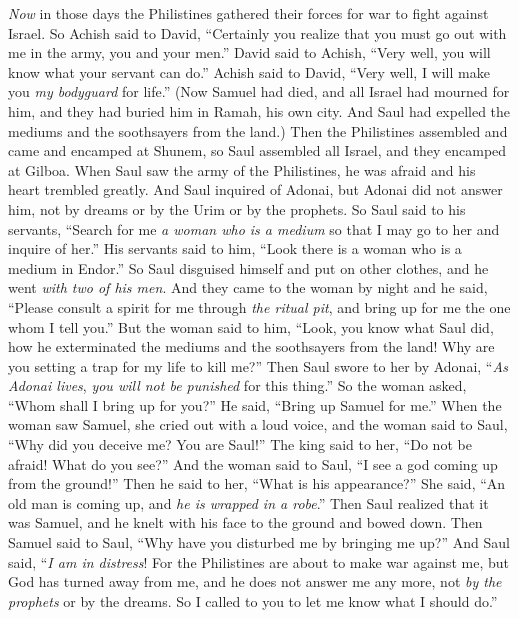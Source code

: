 \begin{biblechapter} %
\verse \textit{Now} in those days the Philistines gathered their forces for war to fight against Israel. So Achish said to David, “Certainly you realize that you must go out with me in the army, you and your men.”
\verse David said to Achish, “Very well, you will know what your servant can do.” Achish said to David, “Very well, I will make you \textit{my bodyguard} for life.”
 (Now Samuel had died, and all Israel had mourned for him, and they had buried him in Ramah, his own city. And Saul had expelled the mediums and the soothsayers from the land.)
\verse Then the Philistines assembled and came and encamped at Shunem, so Saul assembled all Israel, and they encamped at Gilboa.
\verse When Saul saw the army of the Philistines, he was afraid and his heart trembled greatly.
\verse And Saul inquired of Adonai, but Adonai did not answer him, not by dreams or by the Urim or by the prophets.
\verse So Saul said to his servants, “Search for me \textit{a woman who is a medium} so that I may go to her and inquire of her.” His servants said to him, “Look there is a woman who is a medium in Endor.”
\verse So Saul disguised himself and put on other clothes, and he went \textit{with two of his men}. And they came to the woman by night and he said, “Please consult a spirit for me through \textit{the ritual pit}, and bring up for me the one whom I tell you.”
\verse But the woman said to him, “Look, you know what Saul did, how he exterminated the mediums and the soothsayers from the land! Why are you setting a trap for my life to kill me?”
\verse Then Saul swore to her by Adonai, “\textit{As Adonai lives}, \textit{you will not be punished} for this thing.”
\verse So the woman asked, “Whom shall I bring up for you?” He said, “Bring up Samuel for me.”
\verse When the woman saw Samuel, she cried out with a loud voice, and the woman said to Saul, “Why did you deceive me? You are Saul!”
\verse The king said to her, “Do not be afraid! What do you see?” And the woman said to Saul, “I see a god coming up from the ground!”
\verse Then he said to her, “What is his appearance?” She said, “An old man is coming up, and \textit{he is wrapped in a robe}.” Then Saul realized that it was Samuel, and he knelt with his face to the ground and bowed down.
\verse Then Samuel said to Saul, “Why have you disturbed me by bringing me up?” And Saul said, “\textit{I am in distress}! For the Philistines are about to make war against me, but God has turned away from me, and he does not answer me any more, not \textit{by the prophets} or by the dreams. So I called to you to let me know what I should do.”

\end{biblechapter}
